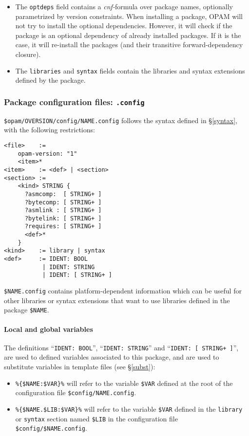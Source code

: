 \documentclass[a4paper,11pt]{article}
\begin{document}
\begin{itemize}
\item The {\tt optdeps} field contains a {\em cnf-}formula over
  package names, optionally parametrized by version constraints. When
  installing a package, OPAM will not try to install the optional
  dependencies.  However, it will check if the package is an optional
  dependency of already installed packages. If it is the case, it will
  re-install the packages (and their transitive forward-dependency
  closure).

\item The {\tt libraries} and {\tt syntax} fields contain the
  libraries and syntax extensions defined by the package.

\end{itemize}

\subsubsection{Package configuration files: {\tt .config}}
\label{dotconfig}

\verb+$opam/OVERSION/config/NAME.config+ follows the syntax defined in
\S\ref{syntax}, with the following restrictions:

{\small
\begin{Verbatim}[frame=single]
<file>    :=
    opam-version: "1"
    <item>*
<item>    := <def> | <section>
<section> :=
    <kind> STRING {
      ?asmcomp:  [ STRING+ ]
      ?bytecomp: [ STRING+ ]
      ?asmlink : [ STRING+ ]
      ?bytelink: [ STRING+ ]
      ?requires: [ STRING+ ]
      <def>*
    }
<kind>    := library | syntax
<def>     := IDENT: BOOL
           | IDENT: STRING
           | IDENT: [ STRING+ ]
\end{Verbatim}
}

\verb+$NAME.config+ contains platform-dependent information which can
be useful for other libraries or syntax extensions that want to use
libraries defined in the package \verb+$NAME+.

\paragraph{Local and global variables}

The definitions ``{\tt IDENT: BOOL}'', ``{\tt IDENT: STRING}'' and ``{\tt IDENT:
  [ STRING+ ]}'', are used to defined variables associated to this
package, and are used to substitute variables in template files (see
\S\ref{subst}):

\begin{itemize}

\item \verb+%{$NAME:$VAR}%+ will refer to the variable \verb+$VAR+
  defined at the root of the configuration file \verb+$config/NAME.config+.

\item \verb+%{$NAME.$LIB:$VAR}%+ will refer to the variable \verb+$VAR+
  defined in the {\tt library} or {\tt syntax} section named
  \verb+$LIB+ in the configuration file \verb+$config/$NAME.config+.

\end{itemize}
\end{document}
